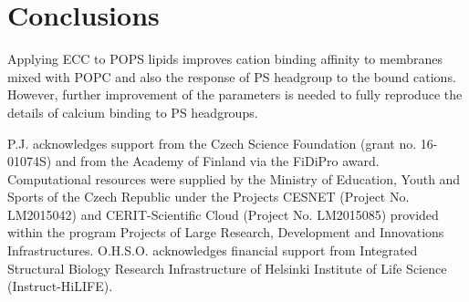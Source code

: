 \documentclass[journal=jpcbfk,manuscript=article]{achemso}
\begin{document}
 
\section{Conclusions} 

Applying ECC to POPS lipids improves cation binding affinity to membranes
mixed with POPC and also the response of PS headgroup to the bound cations.
However, further improvement of the parameters is needed to fully reproduce the
details of calcium binding to PS headgroups.



\listoftodos


\begin{acknowledgement} 
P.J. acknowledges support from the Czech Science Foundation (grant no. 16-01074S)  
and from the Academy of Finland via the FiDiPro award. 
Computational resources were supplied by the Ministry of Education, Youth and Sports 
of the Czech Republic under the Projects CESNET (Project No. LM2015042) and CERIT-Scientific 
Cloud (Project No. LM2015085) provided within the program Projects of Large Research, 
Development and Innovations Infrastructures. 
O.H.S.O. acknowledges financial support from 
Integrated Structural Biology Research Infrastructure of 
Helsinki Institute of Life Science (Instruct-HiLIFE). 
\end{acknowledgement} 
 
\begin{suppinfo} 
 
 
 
\end{suppinfo} 
 
 
 
 
\end{document}
